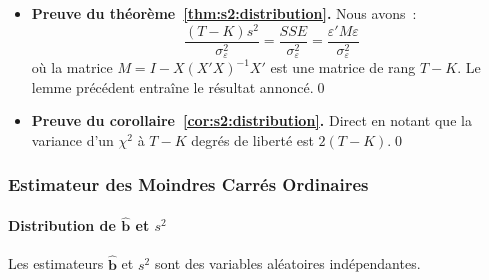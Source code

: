 \documentclass[10pt]{beamer}
\begin{document}
\begin{notes}
\begin{itemize}
     \item \textbf{Preuve du théorème~\ref{thm:s2:distribution}.} Nous avons~:
       \[
         \frac{(T-K)s^2}{\sigma_{\varepsilon}^2} = \frac{SSE}{\sigma_{\varepsilon}^2} = \frac{\varepsilon' M \varepsilon}{\sigma_{\varepsilon}^2}
       \]
       où la matrice $M = I - X(X'X)^{-1}X'$ est une matrice de rang $T-K$. Le lemme précédent entraîne le résultat annoncé.\qed\newline

     \item \textbf{Preuve du corollaire~\ref{cor:s2:distribution}.} Direct en notant que la variance d'un $\chi^2$ à $T-K$ degrés de liberté est $2(T-K).$\qed

     \end{itemize}

\end{notes}


\begin{frame}
  \frametitle{Estimateur des Moindres Carrés Ordinaires}
  \framesubtitle {Distribution de $\hat{\mathbf b}$ et $s^2$}

  \begin{prop}\label{prop:bhat_perp_s2}
    Les estimateurs $\hat{\mathbf b}$ et $s^2$ sont des variables aléatoires indépendantes.
  \end{prop}

\end{frame}
\end{document}
